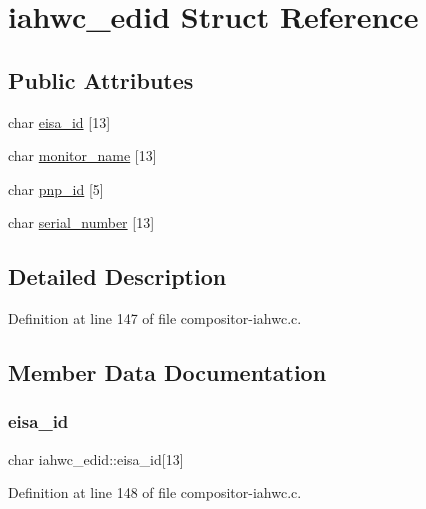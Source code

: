 \hypertarget{structiahwc__edid}{}\section{iahwc\+\_\+edid Struct Reference}
\label{structiahwc__edid}
\subsection*{Public Attributes}
\begin{DoxyCompactItemize}
\item 
char \mbox{\hyperlink{structiahwc__edid_a91cd81f2e24739b635800a0f292d3d1d}{eisa\+\_\+id}} \mbox{[}13\mbox{]}
\item 
char \mbox{\hyperlink{structiahwc__edid_a8ac7bf02ad2abf916be5bc2ce10c9349}{monitor\+\_\+name}} \mbox{[}13\mbox{]}
\item 
char \mbox{\hyperlink{structiahwc__edid_a6e9458c0d30020543837fe1212ff431a}{pnp\+\_\+id}} \mbox{[}5\mbox{]}
\item 
char \mbox{\hyperlink{structiahwc__edid_abeb28c4382a7d860385907cde82ce58d}{serial\+\_\+number}} \mbox{[}13\mbox{]}
\end{DoxyCompactItemize}


\subsection{Detailed Description}


Definition at line 147 of file compositor-\/iahwc.\+c.



\subsection{Member Data Documentation}
\mbox{\label{structiahwc__edid_a91cd81f2e24739b635800a0f292d3d1d}} 
\subsubsection{\texorpdfstring{eisa\+\_\+id}{eisa\_id}}
{\footnotesize\ttfamily char iahwc\+\_\+edid\+::eisa\+\_\+id\mbox{[}13\mbox{]}}



Definition at line 148 of file compositor-\/iahwc.\+c.

